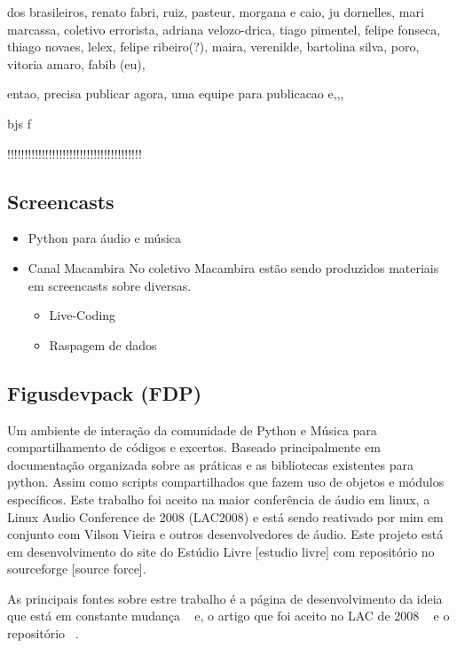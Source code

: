 \begin{itemize}
dos brasileiros, renato fabri, ruiz, pasteur, morgana e caio, ju dornelles, mari marcassa, coletivo errorista, adriana velozo-drica, tiago pimentel, felipe fonseca, thiago novaes, lelex, felipe ribeiro(?), maira, verenilde,  bartolina silva, poro, vitoria amaro, fabib (eu),

entao, precisa publicar agora,
uma equipe para publicacao e,,, 

bjs
f

!!!!!!!!!!!!!!!!!!!!!!!!!!!!!!!!!!!!!!!

\end{itemize}

\subsection{Screencasts}

\begin{itemize}
    \item Python para áudio e música

    \item Canal Macambira
No coletivo Macambira estão sendo produzidos materiais em screencasts sobre
diversas.
    \begin{itemize}
	\item Live-Coding
	\item Raspagem de dados
    \end{itemize}
\end{itemize}



\subsection{Figusdevpack (FDP)}

Um ambiente de interação da comunidade de Python e Música 
para compartilhamento de códigos e excertos. Baseado principalmente
em documentação organizada sobre as práticas e as bibliotecas
existentes para python. Assim como scripts compartilhados que
fazem uso de objetos e módulos específicos. Este trabalho foi aceito na
maior conferência de áudio em linux, a Linux Audio Conference de 2008
(LAC2008) e está sendo reativado por mim em conjunto com Vilson Vieira
e outros desenvolvedores de áudio. Este projeto está em desenvolvimento
do site do Estúdio Livre [estudio livre] com repositório no sourceforge [source force].

As principais fontes sobre estre trabalho é a página de desenvolvimento da ideia
que está em constante mudança ~\cite{http://estudiolivre.org/tiki-index.php?page=fdp&highlight=fdp fdpel}
e, o artigo que foi aceito no LAC de 2008 ~\cite{http://www.estudiolivre.org/el-gallery_view.php?arquivoId=8221 fdplac2008}
e o repositório ~\cite{http://sourceforge.net/projects/fdpack/develop fdpsf}.

